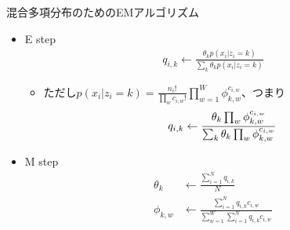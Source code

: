 \documentclass[aspectratio=169,unicode,dvipdfmx,14pt]{beamer}
\begin{document}
\begin{frame}{混合多項分布のためのEMアルゴリズム}
\vspace{-.1in}
\begin{itemize}
\item E step
\vspace{-.1in}
\begin{align}
q_{i,k} \leftarrow \frac{ \theta_k p(x_i | z_i = k) }{ \sum_k \theta_k p(x_i | z_i = k) }
\end{align}
\vspace{-.1in}
\begin{itemize}
\item[] ただし$p(x_i | z_i = k) = \frac{n_i!}{\prod_w c_{i,w}!} \prod_{w=1}^W \phi_{k,w}^{c_{i,w}}$、つまり
\begin{align}
q_{i,k} \leftarrow \frac{ \theta_k \prod_w \phi_{k,w}^{c_{i,w}} }{ \sum_k \theta_k \prod_w \phi_{k,w}^{c_{i,w}} } \notag
\end{align}
\end{itemize}
\vspace{-.1in}
\item M step
\vspace{-.1in}
\begin{align}
\theta_k & \leftarrow \frac{ \sum_{i=1}^N q_{i,k} }{ N } \\
\phi_{k,w} & \leftarrow \frac{ \sum_{i=1}^N q_{i,k} c_{i,w} }{ \sum_{w=1}^W \sum_{i=1}^N q_{i,k} c_{i,w} }
\end{align}
\end{itemize}
\end{frame}
\end{document}
